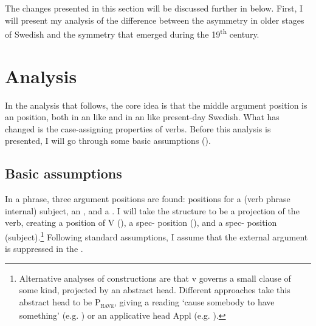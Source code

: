 \documentclass[output=paper]{langscibook}
\begin{document}
The changes presented in this section will be discussed further in  below. First, I will present my analysis of the difference between the asymmetry in older stages of Swedish and the symmetry that emerged during the 19\textsuperscript{th} century.

\section{Analysis}\label{sec:falk:4}


In the analysis that follows, the core idea is that the middle argument position is an  position, both in an  like  and in an  like present-day Swedish. What has changed is the case-assigning properties of  verbs. Before this analysis is presented, I will go through some basic assumptions ().

\subsection{Basic assumptions}\label{sec:falk:4.1}


In a  phrase, three argument positions are found: positions for a (verb phrase internal) subject, an , and a . I will take the structure to be a projection of the verb, creating a  position of V (), a spec- position (), and a spec- position (subject).\footnote{Alternative analyses of  constructions are that v governs a small clause of some kind, projected by an abstract head. Different approaches take this abstract head to be P\textsc{\textsubscript{have}}, giving a reading ‘cause somebody to have something’ (e.g. \citealt{HarleyJung2015}) or an applicative head Appl (e.g. \citealt{Pylkkanen2008}).} Following standard assumptions, I assume that the external argument is suppressed in the .
\end{document}
